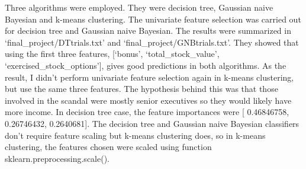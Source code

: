 \documentclass[12pt]{article}
\begin{document}
Three algorithms were employed. They were decision tree, Gaussian naive Bayesian and k-means clustering. The univariate feature selection was carried out for decision tree and Gaussian naive Bayesian. The results were summarized in `final\_project/DTtrials.txt' and `final\_project/GNBtrials.txt'. They showed that using the first three features, [`bonus', `total\_stock\_value', `exercised\_stock\_options'], gives good predictions in both algorithms. As the result, I didn't perform univariate feature selection again in k-means clustering, but use the same three features. The hypothesis behind this was that those involved in the scandal were mostly senior executives so they would likely have more income. In decision tree case, the feature importances were [ 0.46846758,  0.26746432,  0.2640681].
The decision tree and Gaussian naive Bayesian classifiers don't require feature scaling but k-means clustering does, so in k-means clustering, the features chosen were scaled using function sklearn.preprocessing.scale().
\end{document}
